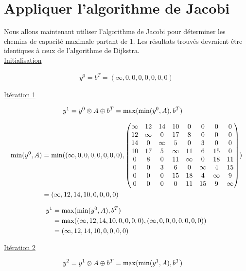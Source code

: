 \documentclass{article}
\begin{document}
\section{Appliquer l'algorithme de Jacobi}

Nous allons maintenant utiliser l'algorithme de Jacobi pour déterminer
les chemins de capacité maximale partant de 1. Les résultats trouvés
devraient être identiques à ceux de l'algorithme de Dijkstra.\\

\underline{Initialisation}

\begin{align*}
  y^0 = b^T = (\infty, 0, 0, 0, 0, 0, 0, 0)
\end{align*}

\underline{Itération 1}

\begin{align*}
  y^1 &= y^0 \otimes A \oplus b^T = \operatorname{max}(\operatorname{min}(y^0,A),b^T)
\end{align*}

\begin{align*}
  \operatorname{min}(y^0,A) &= \operatorname{min}((\infty,0,0,0,0,0,0,0),
  \begin{pmatrix}
      \infty & 12 & 14 & 10 & 0 & 0 & 0 & 0 \\
      12 & \infty & 0 & 17 & 8 & 0 & 0 & 0 \\
      14 & 0 & \infty & 5 & 0 & 3 & 0 & 0 \\
      10 & 17 & 5 & \infty & 11 & 6 & 15 & 0 \\
      0 & 8 & 0 & 11 & \infty & 0 & 18 & 11 \\
      0 & 0 & 3 & 6 & 0 & \infty & 4 & 15 \\
      0 & 0 & 0 & 15 & 18 & 4 & \infty & 9 \\
      0 & 0 & 0 & 0 & 11 & 15 & 9 & \infty
  \end{pmatrix})\\
  &= (\infty,12,14,10,0,0,0,0)
\end{align*}

\begin{align*}
  y^1 &= \operatorname{max}(\operatorname{min}(y^0,A),b^T)\\
  &= \operatorname{max}((\infty, 12,14,10,0,0,0,0), (\infty,0,0,0,0,0,0,0))\\
  &= (\infty, 12,14,10,0,0,0,0)
\end{align*}

\underline{Itération 2}

\begin{align*}
  y^2 &= y^1 \otimes A \oplus b^T = \operatorname{max}(\operatorname{min}(y^1,A),b^T)
\end{align*}
\end{document}
